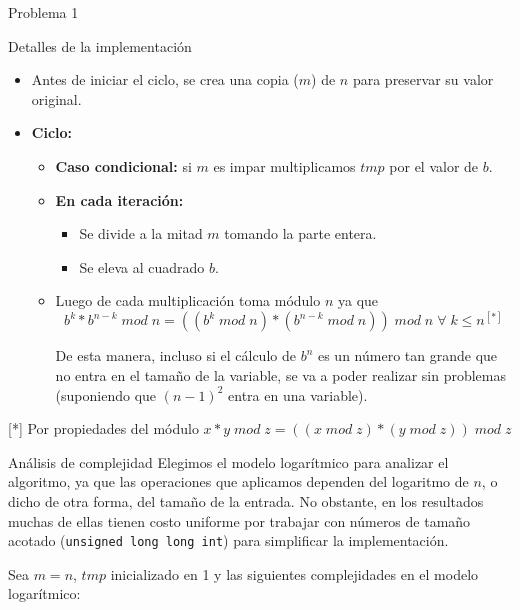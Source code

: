 \begin{section}{Problema 1}
\begin{subsection}{Detalles de la implementación}
\begin{itemize}
			\item Antes de iniciar el ciclo, se crea una copia ($m$) de $n$ para preservar su valor original.

			\item \textbf{Ciclo:}
			\begin{itemize}
				
				\item \textbf{Caso condicional:} si $m$ es impar multiplicamos $tmp$ por el valor de $b$.
				
				\item \textbf{En cada iteración:}
				\begin{itemize}
					\item Se divide a la mitad $m$ tomando la parte entera.
					\item Se eleva al cuadrado $b$.
				\end{itemize}

				\item Luego de cada multiplicación toma módulo $n$ ya que
				$$b^k * b^{n-k}\; mod\;n = ((b^k\;mod\;n)*(b^{n-k}\;mod\;n))\;mod\;n\;\forall\;k\leq n ^{[*]}$$ 
	
				De esta manera, incluso si el cálculo de $b^n$ es un número tan grande que no entra en el 
				tamaño de la variable, se va a poder realizar sin problemas (suponiendo que $(n-1)^2$ entra 
				en una variable).

			\end{itemize}
		\end{itemize}
		
		\vspace{0.5cm}
		{\footnotesize [*] Por propiedades del módulo $x*y\; mod \; z = ((x\; mod\; z)*(y\; mod\; z))\;mod\; z$ } \\
		
	\end{subsection}



	\begin{subsection}{Análisis de complejidad}
		Elegimos el modelo logarítmico para analizar el algoritmo, ya que las operaciones que aplicamos dependen del logaritmo de $n$, o dicho de otra forma, del tamaño de la entrada. No obstante, en los resultados muchas de ellas tienen costo uniforme por trabajar con números de tamaño acotado (\texttt{unsigned long long int}) para simplificar la implementación.

		Sea $m = n$, $tmp$ inicializado en 1 y las siguientes complejidades en el modelo logarítmico:


\end{subsection}
\end{section}
